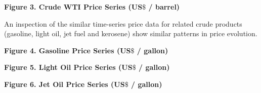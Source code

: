 \documentclass[12pt,twoside]{article}
\begin{document}
\vspace{\baselineskip}
\vspace{\baselineskip}\setlength{\parskip}{12.0pt}
\begin{Center}
{\fontsize{11pt}{13.2pt}\selectfont \textbf{Figure 3. Crude WTI Price Series (US$\$$  / barrel)}\par}
\end{Center}\par


\vspace{\baselineskip}\begin{justify}
{\fontsize{11pt}{13.2pt}\selectfont An inspection of the similar time-series price data for related crude products (gasoline, light oil, jet fuel and kerosene) show similar patterns in price evolution.\par}
\end{justify}\par

\begin{justify}
{\fontsize{11pt}{13.2pt}\selectfont \par}
\end{justify}
\vspace{\baselineskip}
\vspace{\baselineskip}\begin{Center}
{\fontsize{11pt}{13.2pt}\selectfont \textbf{Figure 4. Gasoline Price Series (US$\$$  / gallon)}\par}
\end{Center}\par


\vspace{\baselineskip}
\vspace{\baselineskip}
\vspace{\baselineskip}\begin{Center}
{\fontsize{11pt}{13.2pt}\selectfont \textbf{Figure 5. Light Oil Price Series (US$\$$  / gallon)}\par}
\end{Center}\par


\vspace{\baselineskip}
\vspace{\baselineskip}
\vspace{\baselineskip}\begin{Center}
{\fontsize{11pt}{13.2pt}\selectfont \textbf{Figure 6. Jet Oil Price Series (US$\$$  / gallon)}\par}
\end{Center}\par
\end{document}
